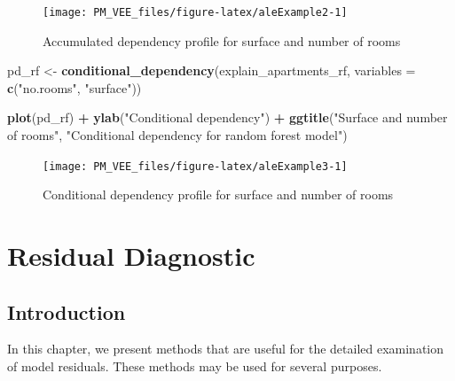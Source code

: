 \documentclass[12pt,]{krantz}
\newenvironment{Shaded}{\begin{snugshade}}{\end{snugshade}}
\newcommand{\DataTypeTok}[1]{\textcolor[rgb]{0.13,0.29,0.53}{#1}}
\newcommand{\KeywordTok}[1]{\textcolor[rgb]{0.13,0.29,0.53}{\textbf{#1}}}
\newcommand{\NormalTok}[1]{#1}
\newcommand{\OperatorTok}[1]{\textcolor[rgb]{0.81,0.36,0.00}{\textbf{#1}}}
\newcommand{\StringTok}[1]{\textcolor[rgb]{0.31,0.60,0.02}{#1}}
\begin{document}
\begin{figure}

{\centering \texttt{[image: PM\_VEE\_files/figure-latex/aleExample2-1]} 

}

\caption{Accumulated dependency profile for surface and number of rooms}\label{fig:aleExample2}
\end{figure}

\begin{Shaded}
\begin{Highlighting}[]
\NormalTok{pd_rf <-}\StringTok{ }\KeywordTok{conditional_dependency}\NormalTok{(explain_apartments_rf, }\DataTypeTok{variables =} \KeywordTok{c}\NormalTok{(}\StringTok{"no.rooms"}\NormalTok{, }\StringTok{"surface"}\NormalTok{))}

\KeywordTok{plot}\NormalTok{(pd_rf) }\OperatorTok{+}\StringTok{ }\KeywordTok{ylab}\NormalTok{(}\StringTok{"Conditional dependency"}\NormalTok{) }\OperatorTok{+}
\StringTok{  }\KeywordTok{ggtitle}\NormalTok{(}\StringTok{"Surface and number of rooms"}\NormalTok{, }\StringTok{"Conditional dependency for random forest model"}\NormalTok{) }
\end{Highlighting}
\end{Shaded}

\begin{figure}

{\centering \texttt{[image: PM\_VEE\_files/figure-latex/aleExample3-1]} 

}

\caption{Conditional dependency profile for surface and number of rooms}\label{fig:aleExample3}
\end{figure}

\hypertarget{residualDiagnostic}{%
\section{Residual Diagnostic}\label{residualDiagnostic}}

\hypertarget{introduction-2}{%
\subsection{Introduction}\label{introduction-2}}

In this chapter, we present methods that are useful for the detailed examination of model residuals. These methods may be used for several purposes.
\end{document}
